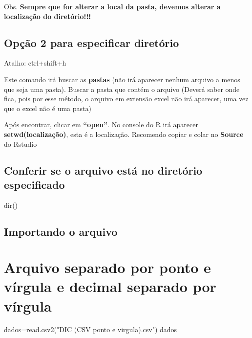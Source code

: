 \documentclass[
]{book}
\newenvironment{Shaded}{\begin{snugshade}}{\end{snugshade}}
\newcommand{\FunctionTok}[1]{\textcolor[rgb]{0.00,0.00,0.00}{#1}}
\newcommand{\NormalTok}[1]{#1}
\newcommand{\OtherTok}[1]{\textcolor[rgb]{0.56,0.35,0.01}{#1}}
\newcommand{\StringTok}[1]{\textcolor[rgb]{0.31,0.60,0.02}{#1}}
\begin{document}
Obs. \textbf{Sempre que for alterar a local da pasta, devemos alterar a localização do diretório!!!}

\hypertarget{opuxe7uxe3o-2-para-especificar-diretuxf3rio-1}{%
\subsection{Opção 2 para especificar diretório}\label{opuxe7uxe3o-2-para-especificar-diretuxf3rio-1}}

Atalho: ctrl+shift+h

Este comando irá buscar as \textbf{pastas} (não irá aparecer nenhum arquivo a menos que seja uma pasta). Buscar a pasta que contém o arquivo (Deverá saber onde fica, pois por esse método, o arquivo em extensão excel não irá aparecer, uma vez que o excel não é uma pasta)

Após encontrar, clicar em \textbf{``open''}. No console do R irá aparecer \textbf{setwd(localização)}, esta é a localização. Recomendo copiar e colar no \textbf{Source} do Rstudio

\hypertarget{conferir-se-o-arquivo-estuxe1-no-diretuxf3rio-especificado-1}{%
\subsection{Conferir se o arquivo está no diretório especificado}\label{conferir-se-o-arquivo-estuxe1-no-diretuxf3rio-especificado-1}}

\begin{Shaded}
\begin{Highlighting}[]
\FunctionTok{dir}\NormalTok{()}
\end{Highlighting}
\end{Shaded}

\hypertarget{importando-o-arquivo}{%
\subsection{Importando o arquivo}\label{importando-o-arquivo}}

\hypertarget{arquivo-separado-por-ponto-e-vuxedrgula-e-decimal-separado-por-vuxedrgula}{%
\section{Arquivo separado por ponto e vírgula e decimal separado por vírgula}\label{arquivo-separado-por-ponto-e-vuxedrgula-e-decimal-separado-por-vuxedrgula}}

\begin{Shaded}
\begin{Highlighting}[]
\NormalTok{dados}\OtherTok{=}\FunctionTok{read.csv2}\NormalTok{(}\StringTok{"DIC (CSV ponto e virgula).csv"}\NormalTok{)}
\NormalTok{dados}
\end{Highlighting}
\end{Shaded}
\end{document}

